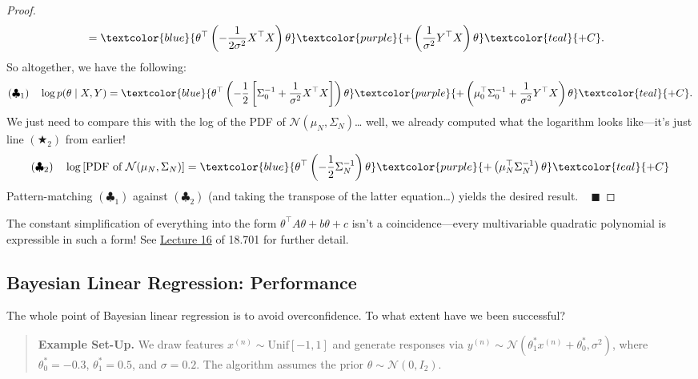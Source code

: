 \begin{proof}
\begin{align*}
        & = \textcolor{blue}{
            \theta^{\top}\left(
                -\frac{1}{2\sigma^2} X^{\top}X
            \right)\theta
        } \textcolor{purple}{
            +\left(\frac{1}{\sigma^2}Y^{\top}X\right)\theta
        } \textcolor{teal}{+C}.
    \end{align*}
    So altogether, we have the following:
    \[
        (\clubsuit_1) ~~~
        \log p(\theta \mid X, Y)
        = \textcolor{blue}{
            \theta^{\top}\left(
                -\frac{1}{2}\left[
                    \Sigma_0^{-1} + \frac{1}{\sigma^2}X^{\top}X
                \right]
            \right) \theta
        } \textcolor{purple}{+ \left(
            \mu_0^{\top}\Sigma_0^{-1} + \frac{1}{\sigma^2}Y^{\top}X
        \right)\theta} \textcolor{teal}{+C}.
    \]
    We just need to compare this with
    the log of the PDF of $\mathcal{N}(\mu_N, \Sigma_N)$\dots
    well, we already computed what the logarithm looks like---it's
    just line $(\bigstar_2)$ from earlier!
    \[
        (\clubsuit_2) ~~~
        \log \left[\text{PDF of } \mathcal{N}(\mu_N, \Sigma_N)\right]
        = \textcolor{blue}{\theta^{\top}\left(
            -\frac{1}{2}\Sigma_N^{-1}
        \right)\theta}
        \textcolor{purple}{+ \left(\mu_N^{\top}\Sigma_N^{-1}\right)\theta}
        \textcolor{teal}{+C}
    \]
    Pattern-matching $(\clubsuit_1)$ against $(\clubsuit_2)$
    (and taking the transpose of the latter equation\dots)
    yields the desired result. ~ $\blacksquare$
\end{proof}

\begin{remark}
    The constant simplification of everything
    into the form $\theta^{\top}A\theta + b\theta + c$
    isn't a coincidence---every multivariable quadratic polynomial
    is expressible in such a form!  See
    \href{/18.701/lectures/16/#foreshadowing-quadratic-polynomials-are-bilinear-forms}{Lecture 16}
    of 18.701 for further detail.
\end{remark}

\subsection{Bayesian Linear Regression: Performance}

The whole point of Bayesian linear regression
is to avoid overconfidence.
To what extent have we been successful?

\begin{quote}
    \textbf{Example Set-Up.}
    We draw features $x^{(n)} \sim \mathrm{Unif}[-1, 1]$
    and generate responses via
    $y^{(n)} \sim \mathcal{N}(\theta_1^*x^{(n)} + \theta_0^*, \sigma^2)$,
    where $\theta_0^* = -0.3$, $\theta_1^* = 0.5$, and $\sigma = 0.2$.
    The algorithm assumes the prior $\theta \sim \mathcal{N}(0, I_2)$.
\end{quote}

